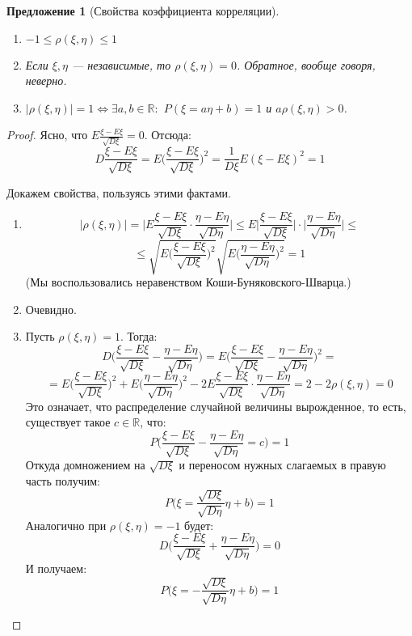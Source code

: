 \documentclass[11pt,openany,a4paper]{scrartcl}
\theoremstyle{plain}
\newtheorem{proposition}[theorem]{Предложение}
\theoremstyle{definition}
\newcommand\mb{\mathbb}
\newcommand\real{\mb R}
\begin{document}
\begin{proposition}[Свойства коэффициента корреляции]
\mbox{}
    \begin{enumerate}
        \item $-1 \leqslant \rho(\xi, \eta) \leqslant 1$
        \item Если $\xi, \eta$ — независимые, то $\rho(\xi, \eta) = 0$. Обратное,
        вообще говоря, неверно.
        \item $|\rho(\xi, \eta)| = 1 \iff \exists a,b \in \real:$
        $P(\xi = a\eta + b) = 1$ и $a\rho(\xi, \eta) > 0$.
    \end{enumerate}
\end{proposition}
\begin{proof}
    Ясно, что $E\frac{\xi - E\xi}{\sqrt{D\xi}} = 0$. Отсюда:
    $$
    D\frac{\xi - E\xi}{\sqrt{D\xi}} =
    E\bigg(\frac{\xi - E\xi}{\sqrt{D\xi}}\bigg)^2 =
    \frac{1}{D\xi}E(\xi - E\xi)^2 = 1
    $$
    
    Докажем свойства, пользуясь этими фактами.
    \begin{enumerate}
        \item
        $$
        |\rho(\xi, \eta)| = \bigg|E\frac{\xi - E\xi}{\sqrt{D\xi}}\cdot
        \frac{\eta - E\eta}{\sqrt{D\eta}}\bigg| \leqslant
        E\bigg|\frac{\xi - E\xi}{\sqrt{D\xi}}\bigg|\cdot
        \bigg|\frac{\eta - E\eta}{\sqrt{D\eta}}\bigg| \leqslant
        $$
        $$
        \leqslant
        \sqrt{E\bigg(\frac{\xi - E\xi}{\sqrt{D\xi}}\bigg)^2}
        \sqrt{E\bigg(\frac{\eta - E\eta}{\sqrt{D\eta}}\bigg)^2} = 1
        $$
        (Мы воспользовались неравенством Коши-Буняковского-Шварца.)
        \item Очевидно.
        \item Пусть $\rho(\xi, \eta) = 1$. Тогда:
        $$
        D\bigg(\frac{\xi - E\xi}{\sqrt{D\xi}} -
        \frac{\eta - E\eta}{\sqrt{D\eta}}\bigg) =
        E\bigg(\frac{\xi - E\xi}{\sqrt{D\xi}} -
        \frac{\eta - E\eta}{\sqrt{D\eta}}\bigg)^2 =
        $$
        $$
        =
        E\bigg(\frac{\xi - E\xi}{\sqrt{D\xi}}\bigg)^2 +
        E\bigg(\frac{\eta - E\eta}{\sqrt{D\eta}}\bigg)^2 -
        2E\frac{\xi - E\xi}{\sqrt{D\xi}} \cdot \frac{\eta - E\eta}{\sqrt{D\eta}} =
        2 - 2\rho(\xi, \eta) = 0
        $$
        Это означает, что распределение случайной величины вырожденное, то есть, существует такое
        $c \in \real$, что:
        $$
        P\bigg(\frac{\xi - E\xi}{\sqrt{D\xi}} -
        \frac{\eta - E\eta}{\sqrt{D\eta}} = c\bigg) = 1
        $$
        Откуда домножением на $\sqrt{D\xi}$ и переносом нужных слагаемых в правую часть получим:
        $$
        P\bigg(\xi = \frac{\sqrt{D\xi}}{\sqrt{D\eta}}\eta + b\bigg) = 1
        $$
        Аналогично при $\rho(\xi, \eta) = -1$ будет:
        $$
        D\bigg(\frac{\xi - E\xi}{\sqrt{D\xi}} +
        \frac{\eta - E\eta}{\sqrt{D\eta}}\bigg) = 0
        $$
        И получаем:
        $$
        P\bigg(\xi = -\frac{\sqrt{D\xi}}{\sqrt{D\eta}}\eta + b\bigg) = 1
        $$
    \end{enumerate}
\end{proof}
\end{document}
